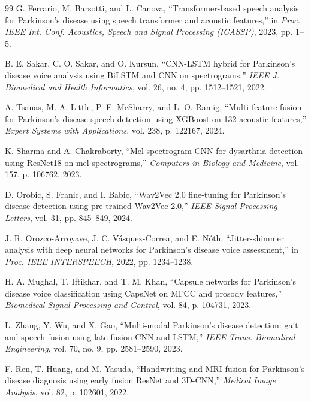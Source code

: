 \documentclass[10pt,conference,letterpaper]{IEEEtran}
\begin{document}
\begin{thebibliography}{99}
 G. Ferrario, M. Barsotti, and L. Canova, ``Transformer-based speech analysis for {P}arkinson's disease using speech transformer and acoustic features,'' in \textit{Proc. IEEE Int. Conf. Acoustics, Speech and Signal Processing (ICASSP)}, 2023, pp. 1--5.

 B. E. Sakar, C. O. Sakar, and O. Kursun, ``{CNN-LSTM} hybrid for {P}arkinson's disease voice analysis using {BiLSTM} and {CNN} on spectrograms,'' \textit{IEEE J. Biomedical and Health Informatics}, vol. 26, no. 4, pp. 1512--1521, 2022.

 A. Tsanas, M. A. Little, P. E. McSharry, and L. O. Ramig, ``Multi-feature fusion for {P}arkinson's disease speech detection using {XGBoost} on 132 acoustic features,'' \textit{Expert Systems with Applications}, vol. 238, p. 122167, 2024.

 K. Sharma and A. Chakraborty, ``Mel-spectrogram {CNN} for dysarthria detection using {ResNet18} on mel-spectrograms,'' \textit{Computers in Biology and Medicine}, vol. 157, p. 106762, 2023.

 D. Orobic, S. Franic, and I. Babic, ``{Wav2Vec} 2.0 fine-tuning for {P}arkinson's disease detection using pre-trained {Wav2Vec} 2.0,'' \textit{IEEE Signal Processing Letters}, vol. 31, pp. 845--849, 2024.

 J. R. Orozco-Arroyave, J. C. V\'{a}squez-Correa, and E. N\'{o}th, ``Jitter-shimmer analysis with deep neural networks for {P}arkinson's disease voice assessment,'' in \textit{Proc. IEEE INTERSPEECH}, 2022, pp. 1234--1238.

 H. A. Mughal, T. Iftikhar, and T. M. Khan, ``Capsule networks for {P}arkinson's disease voice classification using {CapsNet} on {MFCC} and prosody features,'' \textit{Biomedical Signal Processing and Control}, vol. 84, p. 104731, 2023.


 L. Zhang, Y. Wu, and X. Gao, ``Multi-modal {P}arkinson's disease detection: gait and speech fusion using late fusion {CNN} and {LSTM},'' \textit{IEEE Trans. Biomedical Engineering}, vol. 70, no. 9, pp. 2581--2590, 2023.

 F. Ren, T. Huang, and M. Yasuda, ``Handwriting and {MRI} fusion for {P}arkinson's disease diagnosis using early fusion {ResNet} and 3D-{CNN},'' \textit{Medical Image Analysis}, vol. 82, p. 102601, 2022.


\end{thebibliography}
\end{document}
